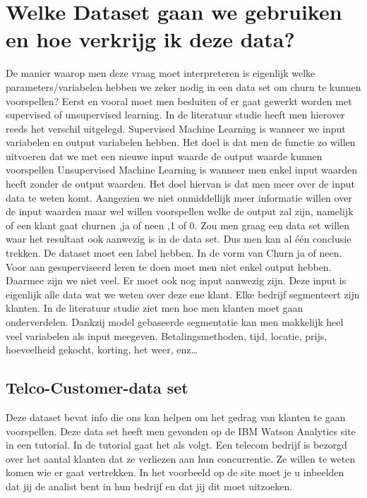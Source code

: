 \section{Welke Dataset gaan we gebruiken en hoe verkrijg ik deze data?}
De manier waarop men deze vraag moet interpreteren is eigenlijk welke parameters/variabelen hebben we zeker nodig in een data set om churn te kunnen voorspellen? Eerst en vooral moet men besluiten of er gaat gewerkt worden met supervised of unsupervised learning. In de literatuur studie heeft men hierover reeds het verschil uitgelegd. \newline
Supervised Machine Learning is wanneer we input variabelen en output variabelen hebben. Het doel is dat men de functie zo willen uitvoeren dat we met een nieuwe input waarde de output waarde kunnen voorspellen\newline
Unsupervised Machine Learning is wanneer men enkel input waarden heeft zonder de output waarden. Het doel hiervan is dat men meer over de input data te weten komt.\newline
Aangezien we niet onmiddellijk meer informatie willen over de input waarden maar wel willen voorspellen welke de output zal zijn, namelijk of een klant gaat churnen ,ja of neen ,1 of 0. Zou men graag een data set willen waar het resultaat ook aanwezig is in de data set.\newline
Dus men kan al één conclusie trekken. De dataset moet een label hebben. In de vorm van Churn ja of neen.\newline
Voor aan gesuperviseerd leren te doen moet men niet enkel output hebben. Daarmee zijn we niet veel. Er moet ook nog input aanwezig zijn. Deze input is eigenlijk alle data wat we weten over deze ene klant. Elke bedrijf segmenteert zijn klanten. In de literatuur studie ziet men hoe men klanten moet gaan onderverdelen. Dankzij model gebaseerde segmentatie kan men makkelijk heel veel variabelen als input meegeven. Betalingsmethoden, tijd, locatie, prijs, hoeveelheid gekocht, korting, het weer, enz…

\subsection{Telco-Customer-data set}
Deze dataset bevat info die ons kan helpen om het gedrag van klanten te gaan voorspellen. Deze data set heeft men gevonden op de IBM Watson Analytics site in een tutorial. In de tutorial gaat het als volgt. Een telecom bedrijf is bezorgd over het aantal klanten dat ze verliezen aan hun concurrentie. Ze willen te weten komen wie er gaat vertrekken. In het voorbeeld op de site moet je u inbeelden dat jij de analist bent in hun bedrijf en dat jij dit moet uitzoeken.

